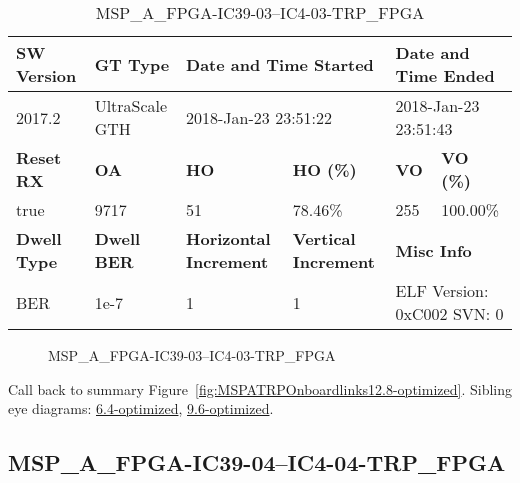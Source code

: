 \begin{table}[h]
\centering
\caption{MSP\_A\_FPGA-IC39-03--IC4-03-TRP\_FPGA}
\label{tab:MSPAFPGAIC3903IC403TRPFPGA12.8-optimized}
\begin{tabular}{@{}|l|l|l|l|l|l|@{}}
\toprule
\textbf{SW Version}                & \textbf{GT Type}   & \multicolumn{2}{l|}{\textbf{Date and Time Started}}            & \multicolumn{2}{l|}{\textbf{Date and Time Ended}}        \\ \midrule
2017.2                       & UltraScale GTH          & \multicolumn{2}{l|}{2018-Jan-23 23:51:22}                   & \multicolumn{2}{l|}{2018-Jan-23 23:51:43}               \\ \midrule
\textbf{Reset RX}                  & \textbf{OA} & \textbf{HO}   & \textbf{HO (\%)} & \textbf{VO} & \textbf{VO (\%)} \\ \midrule
true & 9717        & 51          & 78.46\%        & 255        & 100.00\%       \\ \midrule
\textbf{Dwell Type}                & \textbf{Dwell BER} & \textbf{Horizontal Increment} & \textbf{Vertical Increment}    & \multicolumn{2}{l|}{\textbf{Misc Info}}                  \\ \midrule
BER                            & 1e-7        & 1        & 1           & \multicolumn{2}{l|}{ELF Version: 0xC002 SVN: 0}                         \\ \bottomrule
\end{tabular}
\end{table}

\begin{figure}[h]
\caption{MSP\_A\_FPGA-IC39-03--IC4-03-TRP\_FPGA} \label{fig:MSPAFPGAIC3903IC403TRPFPGA12.8-optimized}
\end{figure}

Call back to summary Figure~\ref{fig:MSPATRPOnboardlinks12.8-optimized}.
Sibling eye diagrams: \hyperref[sec:MSPAFPGAIC3903IC403TRPFPGA6.4-optimized]{6.4-optimized}, \hyperref[sec:MSPAFPGAIC3903IC403TRPFPGA9.6-optimized]{9.6-optimized}.

\clearpage
\newpage


\subsection{MSP\_A\_FPGA-IC39-04--IC4-04-TRP\_FPGA}\label{sec:MSPAFPGAIC3904IC404TRPFPGA12.8-optimized}

